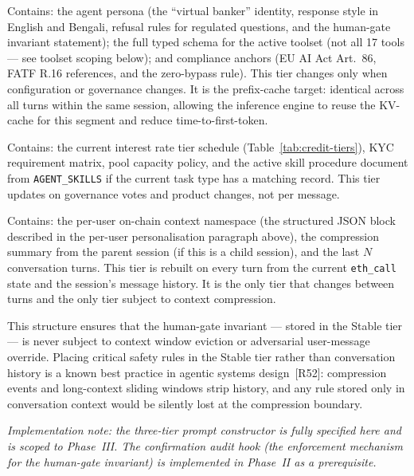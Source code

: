 \documentclass[12pt,a4paper]{report}
\begin{document}
\begin{description}[noitemsep,leftmargin=0pt]
\item[\textbf{Stable tier.}] Contains: the agent persona (the ``virtual banker''
identity, response style in English and Bengali, refusal rules for regulated
questions, and the human-gate invariant statement); the full typed schema for the
active toolset (not all 17 tools --- see toolset scoping below); and compliance
anchors (EU AI Act Art.~86, FATF R.16 references, and the zero-bypass rule). This
tier changes only when configuration or governance changes. It is the prefix-cache
target: identical across all turns within the same session, allowing the inference
engine to reuse the KV-cache for this segment and reduce time-to-first-token.

\item[\textbf{Context tier.}] Contains: the current interest rate tier schedule
(Table~\ref{tab:credit-tiers}), KYC requirement matrix, pool capacity policy, and
the active skill procedure document from \texttt{AGENT\_SKILLS} if the current
task type has a matching record. This tier updates on governance votes and product
changes, not per message.

\item[\textbf{Volatile tier.}] Contains: the per-user on-chain context namespace
(the structured JSON block described in the per-user personalisation paragraph
above), the compression summary from the parent session (if this is a child
session), and the last $N$ conversation turns. This tier is rebuilt on every
turn from the current \texttt{eth\_call} state and the session's message history.
It is the only tier that changes between turns and the only tier subject to context
compression.
\end{description}

\noindent This structure ensures that the human-gate invariant --- stored in the
Stable tier --- is never subject to context window eviction or adversarial
user-message override. Placing critical safety rules in the Stable tier rather than
conversation history is a known best practice in agentic systems
design~[R52]: compression events and long-context sliding windows
strip history, and any rule stored only in conversation context would be silently
lost at the compression boundary.

\textit{Implementation note: the three-tier prompt constructor is fully specified
here and is scoped to Phase~III. The confirmation audit hook (the enforcement
mechanism for the human-gate invariant) is implemented in Phase~II as a
prerequisite.}
\end{document}
